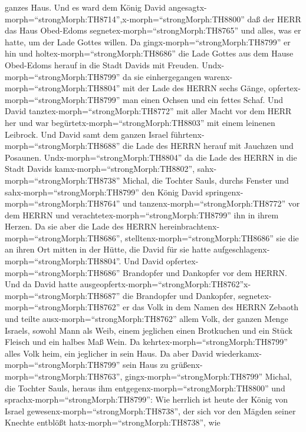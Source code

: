 ganzes Haus.  Und es ward dem König David
angesagtx-morph=``strongMorph:TH8714'',x-morph=``strongMorph:TH8800''
daß der HERR das Haus Obed-Edoms segnetex-morph=``strongMorph:TH8765''
und alles, was er hatte, um der Lade Gottes willen. Da
gingx-morph=``strongMorph:TH8799'' er hin und
holtex-morph=``strongMorph:TH8686'' die Lade Gottes aus dem Hause
Obed-Edoms herauf in die Stadt Davids mit Freuden. 
Undx-morph=``strongMorph:TH8799'' da sie einhergegangen
warenx-morph=``strongMorph:TH8804'' mit der Lade des HERRN sechs Gänge,
opfertex-morph=``strongMorph:TH8799'' man einen Ochsen und ein fettes
Schaf.  Und David tanztex-morph=``strongMorph:TH8772'' mit
aller Macht vor dem HERR her und war
begürtetx-morph=``strongMorph:TH8803'' mit einem leinenen Leibrock.
 Und David samt dem ganzen Israel
führtenx-morph=``strongMorph:TH8688'' die Lade des HERRN herauf mit
Jauchzen und Posaunen.  Undx-morph=``strongMorph:TH8804''
da die Lade des HERRN in die Stadt Davids
kamx-morph=``strongMorph:TH8802'', sahx-morph=``strongMorph:TH8738''
Michal, die Tochter Sauls, durchs Fenster und
sahx-morph=``strongMorph:TH8799'' den König David
springenx-morph=``strongMorph:TH8764'' und
tanzenx-morph=``strongMorph:TH8772'' vor dem HERRN und
verachtetex-morph=``strongMorph:TH8799'' ihn in ihrem Herzen.
 Da sie aber die Lade des HERRN
hereinbrachtenx-morph=``strongMorph:TH8686'',
stelltenx-morph=``strongMorph:TH8686'' sie die an ihren Ort mitten in
der Hütte, die David für sie hatte
aufgeschlagenx-morph=``strongMorph:TH8804''. Und David
opfertex-morph=``strongMorph:TH8686'' Brandopfer und Dankopfer vor dem
HERRN.  Und da David hatte
ausgeopfertx-morph=``strongMorph:TH8762''x-morph=``strongMorph:TH8687''
die Brandopfer und Dankopfer, segnetex-morph=``strongMorph:TH8762'' er
das Volk in dem Namen des HERRN Zebaoth  und teilte
ausx-morph=``strongMorph:TH8762'' allem Volk, der ganzen Menge Israels,
sowohl Mann als Weib, einem jeglichen einen Brotkuchen und ein Stück
Fleisch und ein halbes Maß Wein. Da kehrtex-morph=``strongMorph:TH8799''
alles Volk heim, ein jeglicher in sein Haus.  Da aber David
wiederkamx-morph=``strongMorph:TH8799'' sein Haus zu
grüßenx-morph=``strongMorph:TH8763'', gingx-morph=``strongMorph:TH8799''
Michal, die Tochter Sauls, heraus ihm
entgegenx-morph=``strongMorph:TH8800'' und
sprachx-morph=``strongMorph:TH8799'': Wie herrlich ist heute der König
von Israel gewesenx-morph=``strongMorph:TH8738'', der sich vor den
Mägden seiner Knechte entblößt hatx-morph=``strongMorph:TH8738'', wie
